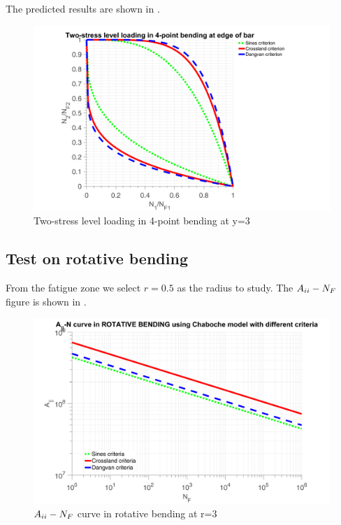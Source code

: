 The predicted results are shown in .

\begin{figure}[h!]
	\centering
	\includegraphics[width=\textwidth]{figures//2stressB.png} 
	\caption{Two-stress level loading in 4-point bending at y=3}
	\label{2stressB}
\end{figure}

\newpage
\subsection{Test on rotative bending}
From the fatigue zone we select $r=0.5$ as the radius to study. 
The $A_{\uppercase\expandafter{\romannumeral2}}-N_F$ figure is shown in .

\begin{figure}[h!]
	\centering
	\includegraphics[width=\textwidth]{figures//JNRB.png} 
	\caption{$A_{\uppercase\expandafter{\romannumeral2}}-N_F$ curve in rotative bending at r=3}
	\label{JNRB}
\end{figure}

